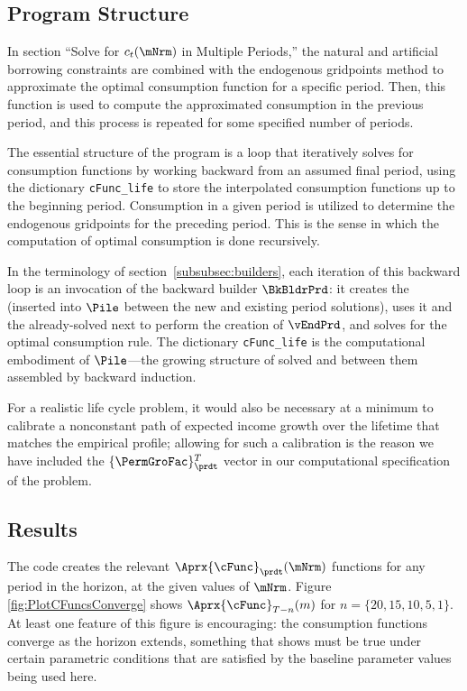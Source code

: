 \subsection{Program Structure}

In section ``Solve for $c_t(\mNrm)$ in Multiple Periods,'' the natural and artificial borrowing constraints are combined with the endogenous gridpoints method to approximate the optimal consumption function for a specific period. Then, this function is used to compute the approximated consumption in the previous period, and this process is repeated for some specified number of periods.

The essential structure of the program is a loop that iteratively solves for consumption functions by working backward from an assumed final period, using the dictionary \texttt{cFunc\_life} to store the interpolated consumption functions up to the beginning period. Consumption in a given period is utilized to determine the endogenous gridpoints for the preceding period. This is the sense in which the computation of optimal consumption is done recursively.

In the terminology of section~\ref{subsubsec:builders}, each iteration of this backward loop is an invocation of the backward builder $\BkBldrPrd$: it creates the {\Cnct} (inserted into $\Pile$ between the new and existing period solutions), uses it and the already-solved next {\interval} to perform the creation of $\vEndPrd$, and solves for the optimal consumption rule.  The dictionary \texttt{cFunc\_life} is the computational embodiment of $\Pile$---the growing structure of solved {\intervals} and {\Cncts} between them assembled by backward induction.

For a realistic life cycle problem, it would also be necessary at a
minimum to calibrate a nonconstant path of expected income growth over the
lifetime that matches the empirical profile; allowing for such
a calibration is the reason we have included the $\{\PermGroFac\}_{\prdt}^{T}$
vector in our computational specification of the problem.

\hypertarget{results}{}
\subsection{Results}

The code creates the relevant $\Aprx{\cFunc}_{\prdt}(\mNrm)$ functions for any period in the horizon, at the given values of $\mNrm$.  Figure \ref{fig:PlotCFuncsConverge} shows $\Aprx{\cFunc}_{T-n}(m)$ for $n=\{20,15,10,5,1\}$.  At least one feature of this figure is encouraging: the consumption functions converge as the horizon extends, something that \cite{BufferStockTheory} shows must be true under certain parametric conditions that are satisfied by the baseline parameter values being used here.

